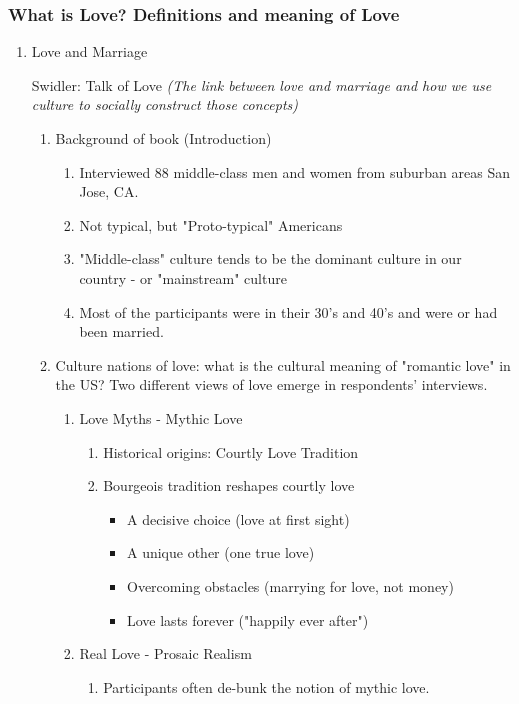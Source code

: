\documentclass[12pt,a4paper]{article}
\begin{document}
\subsubsection{What is Love? Definitions and meaning of Love}
\begin{enumerate}
	\item Love and Marriage
	\begin{eg}{Swidler: Talk of Love \textit{(The link between love and marriage and how we use culture to socially construct those concepts)}}
		\begin{enumerate}
			\item Background of book (Introduction)
			\begin{enumerate}
				\item Interviewed 88 middle-class men and women from suburban areas San Jose, CA.
				\item Not typical, but "Proto-typical" Americans
				\item "Middle-class" culture tends to be the dominant culture in our country - or "mainstream" culture
				\item Most of the participants were in their 30's and 40's and were or had been married. 
			\end{enumerate}	
			\item Culture nations of love: what is the cultural meaning of "romantic love" in the US? Two different views of love emerge in respondents' interviews. 
			\begin{enumerate}
				\item Love Myths - Mythic Love
				\begin{enumerate}
					\item Historical origins: Courtly Love Tradition
					\item Bourgeois tradition reshapes courtly love
					\begin{itemize}
						\item A decisive choice (love at first sight)
						\item A unique other (one true love)
						\item Overcoming obstacles (marrying for love, not money)
						\item Love lasts forever ("happily ever after")	
					\end{itemize}
				\end{enumerate}
				\item Real Love - Prosaic Realism
				\begin{enumerate}
					\item Participants often de-bunk the notion of mythic love.

\end{enumerate}
\end{enumerate}
\end{enumerate}
\end{eg}
\end{enumerate}
\end{document}
